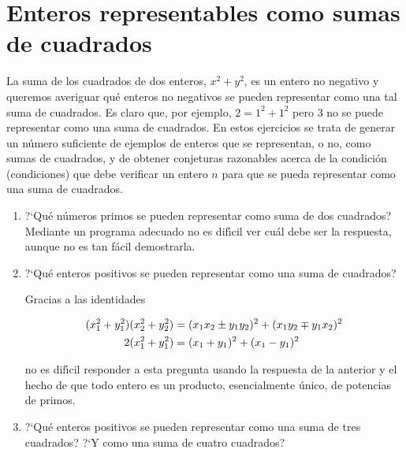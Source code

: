 \section{Enteros representables como sumas de cuadrados}\label{suma-cuadrados}

La suma de los cuadrados de dos enteros, $x^2+y^2$, es un entero no negativo y
queremos averiguar qu\'e enteros no negativos se pueden representar como una tal
suma de cuadrados. Es claro que, por ejemplo, $2=1^2+1^2$ pero $3$ no se puede
representar como una suma de cuadrados. En estos ejercicios se trata de generar
un n\'umero suficiente de ejemplos de enteros que se representan, o no, como
sumas
de cuadrados,  y de obtener conjeturas razonables acerca de la condici\'on
(condiciones) que debe verificar un entero $n$ para que se pueda representar
como una suma de cuadrados.

\begin{ejer}
\begin{enumerate}
\item ?`Qu\'e n\'umeros primos se pueden representar como suma de dos cuadrados?
Mediante un programa adecuado no es dif\'{\i}cil ver cu\'al debe ser la
respuesta, aunque no es tan f\'acil demostrarla.

\item ?`Qu\'e enteros positivos se pueden representar como una suma de
cuadrados?

Gracias a las identidades

\begin{equation}\notag
 \begin{aligned}
  (x_1^2+y_1^2)(x_2^2+y_2^2)&=(x_1x_2\pm y_1y_2)^2+(x_1y_2\mp y_1x_2)^2\\
  2(x_1^2+y_1^2) &=(x_1+y_1)^2+(x_1-y_1)^2
 \end{aligned}
\end{equation}

\noindent no es dif\'{\i}cil responder a esta pregunta usando la respuesta de la
anterior y el hecho de que todo entero es un producto, esencialmente \'unico, 
de potencias de primos. 

\item ?`Qu\'e enteros positivos se pueden representar como una suma de tres
cuadrados? ?`Y como una suma de cuatro cuadrados?
\end{enumerate}
\end{ejer}

